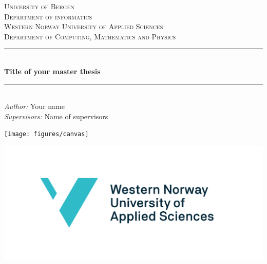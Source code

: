 \begin{titlepage}

\newcommand{\HRule}{\rule{\linewidth}{0.5mm}} %

\center %


\textsc{\large University of Bergen \\ Department of informatics}\\[0.5cm] %
\textsc{\large Western Norway University of Applied Sciences \\ Department of
Computing, Mathematics and Physics}\\[1.5cm]


\HRule \\[1.5cm]
{ \huge \bfseries Title of your master thesis}\\[0.7cm] %
\HRule \\[0.5cm]


\large \emph{Author:} Your name\\
\large \emph{Supervisors:} Name of supervisors\\[2cm]


\centerline{\texttt{[image: figures/canvas]}}  %
\centerline{\includegraphics[scale=0.3]{figures/hvlEnglish}}


\end{titlepage}
